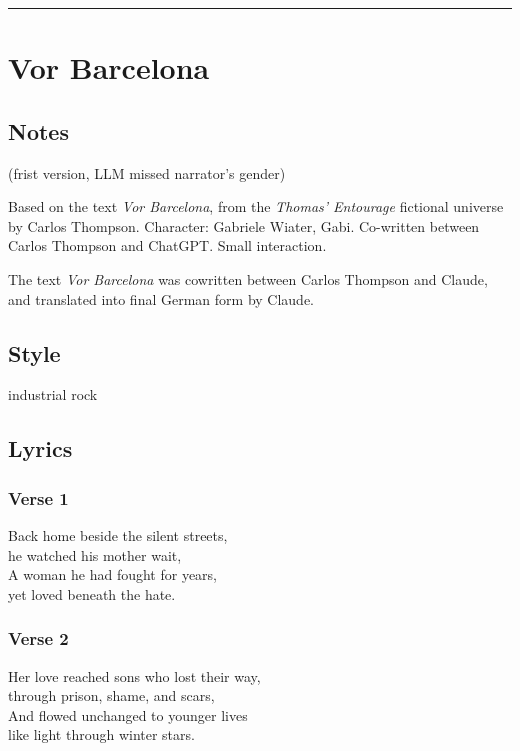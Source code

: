 \begin{center}\rule{0.5\linewidth}{0.5pt}\end{center}

\section{Vor Barcelona}\label{vor-barcelona}

\subsection{Notes}\label{notes-2}

(frist version, LLM missed narrator's gender)

Based on the text \emph{Vor Barcelona}, from the \emph{Thomas'
Entourage} fictional universe by Carlos Thompson. Character: Gabriele
Wiater, Gabi. Co-written between Carlos Thompson and ChatGPT. Small
interaction.

The text \emph{Vor Barcelona} was cowritten between Carlos Thompson and
Claude, and translated into final German form by Claude.

\subsection{Style}\label{style-2}

industrial rock

\subsection{Lyrics}\label{lyrics-2}

\subsubsection{Verse 1}\label{verse-1}

Back home beside the silent streets,\\
he watched his mother wait,\\
A woman he had fought for years,\\
yet loved beneath the hate.

\subsubsection{Verse 2}\label{verse-2}

Her love reached sons who lost their way,\\
through prison, shame, and scars,\\
And flowed unchanged to younger lives\\
like light through winter stars.


